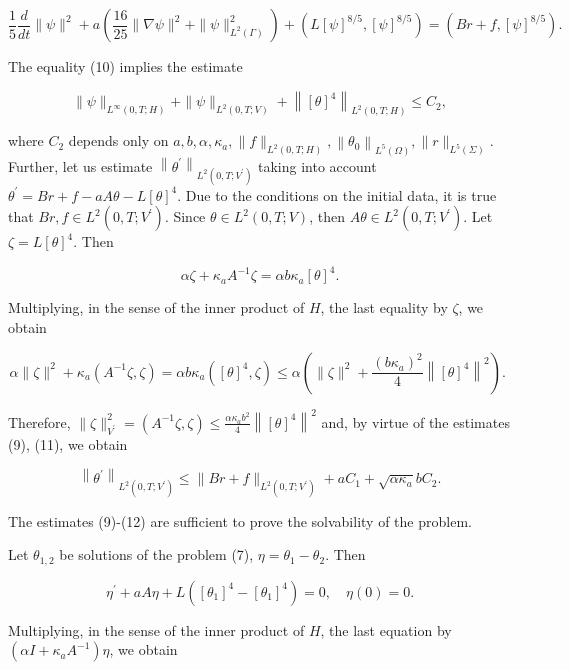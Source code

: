 \documentclass[10pt]{article}
\begin{document}
$$
\frac{1}{5} \frac{d}{d t}\|\psi\|^{2}+a\left(\frac{16}{25}\|\nabla \psi\|^{2}+\|\psi\|_{L^{2}(\Gamma)}^{2}\right)+\left(L[\psi]^{8 / 5},[\psi]^{8 / 5}\right)=\left(B r+f,[\psi]^{8 / 5}\right) .
$$

The equality (10) implies the estimate

$$
\|\psi\|_{L^{\infty}(0, T ; H)}+\|\psi\|_{L^{2}(0, T ; V)}+\left\|[\theta]^{4}\right\|_{L^{2}(0, T ; H)} \leq C_{2},
$$

where $C_{2}$ depends only on $a, b, \alpha, \kappa_{a},\|f\|_{L^{2}(0, T ; H)},\left\|\theta_{0}\right\|_{L^{5}(\Omega)},\|r\|_{L^{5}(\Sigma)}$. Further, let us estimate $\left\|\theta^{\prime}\right\|_{L^{2}\left(0, T ; V^{\prime}\right)}$ taking into account $\theta^{\prime}=B r+f-a A \theta-L[\theta]^{4}$. Due to the conditions on the initial data, it is true that $B r, f \in L^{2}\left(0, T ; V^{\prime}\right)$. Since $\theta \in L^{2}(0, T ; V)$, then $A \theta \in L^{2}\left(0, T ; V^{\prime}\right)$. Let $\zeta=L[\theta]^{4}$. Then

$$
\alpha \zeta+\kappa_{a} A^{-1} \zeta=\alpha b \kappa_{a}[\theta]^{4} .
$$

Multiplying, in the sense of the inner product of $H$, the last equality by $\zeta$, we obtain

$$
\alpha\|\zeta\|^{2}+\kappa_{a}\left(A^{-1} \zeta, \zeta\right)=\alpha b \kappa_{a}\left([\theta]^{4}, \zeta\right) \leq \alpha\left(\|\zeta\|^{2}+\frac{\left(b \kappa_{a}\right)^{2}}{4}\left\|[\theta]^{4}\right\|^{2}\right) \text {. }
$$

Therefore, $\|\zeta\|_{V^{\prime}}^{2}=\left(A^{-1} \zeta, \zeta\right) \leq \frac{\alpha \kappa_{a} b^{2}}{4}\left\|[\theta]^{4}\right\|^{2}$ and, by virtue of the estimates (9), (11), we obtain

$$
\left\|\theta^{\prime}\right\|_{L^{2}\left(0, T ; V^{\prime}\right)} \leq\|B r+f\|_{L^{2}\left(0, T ; V^{\prime}\right)}+a C_{1}+\sqrt{\alpha \kappa_{a}} b C_{2} .
$$

The estimates (9)-(12) are sufficient to prove the solvability of the problem.

Let $\theta_{1,2}$ be solutions of the problem (7), $\eta=\theta_{1}-\theta_{2}$. Then

$$
\eta^{\prime}+a A \eta+L\left(\left[\theta_{1}\right]^{4}-\left[\theta_{1}\right]^{4}\right)=0, \quad \eta(0)=0 .
$$

Multiplying, in the sense of the inner product of $H$, the last equation by $\left(\alpha I+\kappa_{a} A^{-1}\right) \eta$, we obtain
\end{document}
